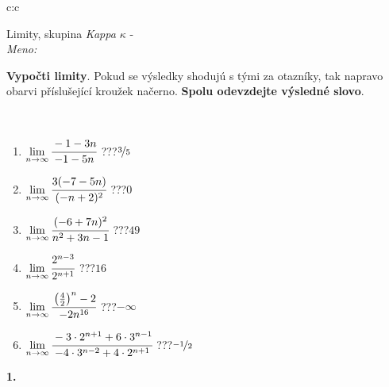 \documentclass[10pt]{report}
\begin{document}
\begin{tabular}{c:c}
\begin{minipage}[c][104.5mm][t]{0.5\linewidth}
\begin{center}
\vspace{7mm}
{\huge Limity, skupina \textit{Kappa $\kappa$} -}\\[5mm]
\textit{Meno:}\phantom{xxxxxxxxxxxxxxxxxxxxxxxxxxxxxxxxxxxxxxxxxxxxxxxxxxxxxxxxxxxxxxxxx}\\[5mm]
\begin{minipage}{0.95\linewidth}
\begin{center}
\textbf{Vypočti limity}. Pokud se výsledky shodujú s tými za otazníky, tak napravo\\obarvi příslušející kroužek načerno. \textbf{Spolu odevzdejte výsledné slovo}.
\end{center}
\end{minipage}
\\[1mm]
\begin{minipage}{0.79\linewidth}
\begin{center}
\begin{varwidth}{\linewidth}
\begin{enumerate}
\normalsize
\item $\lim\limits_{n\to\infty}\cfrac{-1-3n}{-1-5n}$\quad \dotfill\; ???\;\dotfill \quad $\nicefrac{3}{5}$
\item $\lim\limits_{n\to\infty}\cfrac{3(-7-5n)}{(-n+2)^2}$\quad \dotfill\; ???\;\dotfill \quad $0$
\item $\lim\limits_{n\to\infty}\cfrac{(-6+7n)^2}{n^2+3n-1}$\quad \dotfill\; ???\;\dotfill \quad $49$
\item $\lim\limits_{n\to\infty}\cfrac{2^{n-3}}{2^{n+1}}$\quad \dotfill\; ???\;\dotfill \quad $16$
\item $\lim\limits_{n\to\infty}\cfrac{\left(\frac{4}{2}\right)^n -2}{-2n^{16}}$\quad \dotfill\; ???\;\dotfill \quad $-\infty$
\item $\lim\limits_{n\to\infty}\cfrac{-3\cdot 2^{n+1}+6\cdot 3^{n-1}}{-4\cdot 3^{n-2}+4\cdot 2^{n+1}}$\quad \dotfill\; ???\;\dotfill \quad $\nicefrac{-1}{2}$
\end{enumerate}
\end{varwidth}
\end{center}
\end{minipage}
\begin{minipage}{0.20\linewidth}
\begin{center}
{\Huge\bfseries 1.} \\[2mm]

\end{center}
\end{minipage}
\end{center}
\end{minipage}
\end{tabular}
\end{document}
